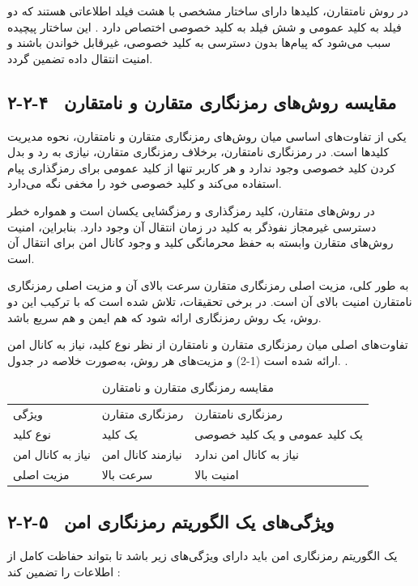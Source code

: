 در روش نامتقارن، کلیدها دارای ساختار مشخصی با هشت فیلد اطلاعاتی هستند که دو فیلد به کلید عمومی و شش فیلد به کلید خصوصی اختصاص دارد \cite{ref28}.  این ساختار پیچیده سبب می‌شود که پیام‌ها بدون دسترسی به کلید خصوصی، غیرقابل خواندن باشند و امنیت انتقال داده تضمین گردد.

\subsection{۲-۲-۴  مقایسه روش‌های رمزنگاری متقارن و نامتقارن}

یکی از تفاوت‌های اساسی میان روش‌های رمزنگاری متقارن و نامتقارن، نحوه مدیریت کلیدها است. در رمزنگاری نامتقارن، برخلاف رمزنگاری متقارن، نیازی به رد و بدل کردن کلید خصوصی وجود ندارد و هر کاربر تنها از کلید عمومی برای رمزگذاری پیام استفاده می‌کند و کلید خصوصی خود را مخفی نگه می‌دارد.

در روش‌های متقارن، کلید رمزگذاری و رمزگشایی یکسان است و همواره خطر دسترسی غیرمجاز نفوذگر به کلید در زمان انتقال آن وجود دارد. بنابراین، امنیت روش‌های متقارن وابسته به حفظ محرمانگی کلید و وجود کانال امن برای انتقال آن است.

به طور کلی، مزیت اصلی رمزنگاری متقارن سرعت بالای آن و مزیت اصلی رمزنگاری نامتقارن امنیت بالای آن است. در برخی تحقیقات، تلاش شده است که با ترکیب این دو روش، یک روش رمزنگاری ارائه شود که هم ایمن و هم سریع باشد\cite{ref29}.

تفاوت‌های اصلی میان رمزنگاری متقارن و نامتقارن از نظر نوع کلید، نیاز به کانال امن و مزیت‌های هر روش، به‌صورت خلاصه در جدول ‎(2-1)‎ ارائه شده است. \cite{ref30}.

\begin{table}[h]
\centering
\small
\begin{tabular}{lll}
\hline
ویژگی & رمزنگاری متقارن & رمزنگاری نامتقارن \\
نوع کلید & یک کلید & یک کلید عمومی و یک کلید خصوصی \\
نیاز به کانال امن & نیازمند کانال امن & نیاز به کانال امن ندارد \\
مزیت اصلی & سرعت بالا & امنیت بالا \\
\hline
\end{tabular}
\caption{مقایسه رمزنگاری متقارن و نامتقارن}
\end{table}

\subsection{۲-۲-۵  ویژگی‌های یک الگوریتم رمزنگاری امن}

یک الگوریتم رمزنگاری امن باید دارای ویژگی‌های زیر باشد تا بتواند حفاظت کامل از اطلاعات را تضمین کند \cite{ref31}:

